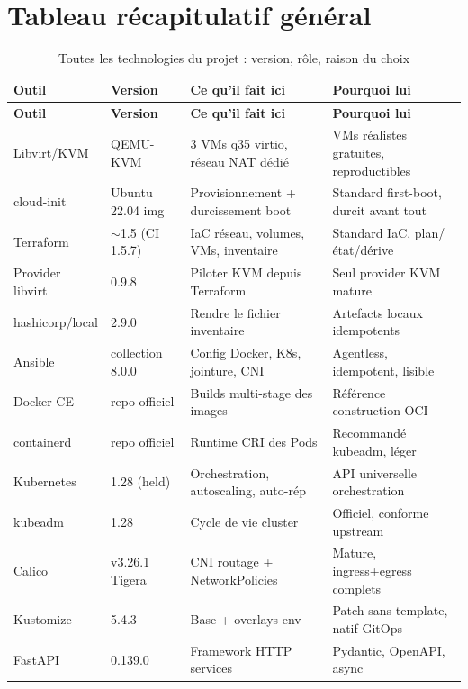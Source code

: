 \documentclass[12pt,a4paper]{article}
\begin{document}
\section{Tableau récapitulatif général}\label{sec:recap}

{\footnotesize
\begin{longtable}{@{}p{3.0cm}p{1.9cm}p{4.7cm}p{4.7cm}@{}}
\caption{Toutes les technologies du projet : version, rôle, raison du choix}\\
\toprule
\textbf{Outil} & \textbf{Version} & \textbf{Ce qu'il fait ici} & \textbf{Pourquoi lui} \\
\midrule
\endfirsthead
\toprule
\textbf{Outil} & \textbf{Version} & \textbf{Ce qu'il fait ici} & \textbf{Pourquoi lui} \\
\midrule
\endhead
Libvirt/KVM & QEMU-KVM & 3 VMs q35 virtio, réseau NAT dédié & VMs réalistes gratuites, reproductibles \\
cloud-init & Ubuntu 22.04 img & Provisionnement + durcissement boot & Standard first-boot, durcit avant tout \\
Terraform & $\sim$1.5 (CI 1.5.7) & IaC réseau, volumes, VMs, inventaire & Standard IaC, plan/état/dérive \\
Provider libvirt & 0.9.8 & Piloter KVM depuis Terraform & Seul provider KVM mature \\
hashicorp/local & 2.9.0 & Rendre le fichier inventaire & Artefacts locaux idempotents \\
Ansible & collection 8.0.0 & Config Docker, K8s, jointure, CNI & Agentless, idempotent, lisible \\
Docker CE & repo officiel & Builds multi-stage des images & Référence construction OCI \\
containerd & repo officiel & Runtime CRI des Pods & Recommandé kubeadm, léger \\
Kubernetes & 1.28 (held) & Orchestration, autoscaling, auto-rép & API universelle orchestration \\
kubeadm & 1.28 & Cycle de vie cluster & Officiel, conforme upstream \\
Calico & v3.26.1 Tigera & CNI routage + NetworkPolicies & Mature, ingress+egress complets \\
Kustomize & 5.4.3 & Base + overlays env & Patch sans template, natif GitOps \\
FastAPI & 0.139.0 & Framework HTTP services & Pydantic, OpenAPI, async \\

\end{longtable}}
\end{document}
